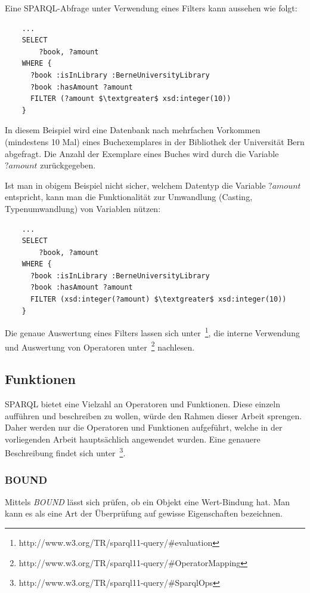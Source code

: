 Eine SPARQL-Abfrage unter Verwendung eines Filters kann aussehen wie folgt:
\begin{lstlisting}
    ...
    SELECT
        ?book, ?amount
    WHERE {
      ?book :isInLibrary :BerneUniversityLibrary
      ?book :hasAmount ?amount
      FILTER (?amount $\textgreater$ xsd:integer(10))
    }
\end{lstlisting}
In diesem Beispiel wird eine Datenbank nach mehrfachen Vorkommen (mindestens 10 Mal) eines Buchexemplares in der Bibliothek der Universität Bern abgefragt. Die Anzahl der Exemplare eines Buches wird durch die Variable $?amount$ zurückgegeben.

Ist man in obigem Beispiel nicht sicher, welchem Datentyp die Variable $?amount$ entspricht, kann man die Funktionalität zur Umwandlung (Casting, Typenumwandlung) von Variablen nützen:
\begin{lstlisting}
    ...
    SELECT
        ?book, ?amount
    WHERE {
      ?book :isInLibrary :BerneUniversityLibrary
      ?book :hasAmount ?amount
      FILTER (xsd:integer(?amount) $\textgreater$ xsd:integer(10))
    }
\end{lstlisting}

Die genaue Auswertung eines Filters lassen sich unter~\footnote{http://www.w3.org/TR/sparql11-query/\#evaluation}, die interne Verwendung und Auswertung von Operatoren unter~\footnote{http://www.w3.org/TR/sparql11-query/\#OperatorMapping} nachlesen.

\subsection{Funktionen}
\label{subsec:sparql_ausdruecke_funktionen}

SPARQL bietet eine Vielzahl an Operatoren und Funktionen. Diese einzeln aufführen und beschreiben zu wollen, würde den Rahmen dieser Arbeit sprengen. Daher werden nur die Operatoren und Funktionen aufgeführt, welche in der vorliegenden Arbeit hauptsächlich angewendet wurden. Eine genauere Beschreibung findet sich unter~\footnote{http://www.w3.org/TR/sparql11-query/\#SparqlOps}.

\subsubsection{BOUND}
\label{subsec:sparql_ausdruecke_funktionen_bound}
Mittels \textit{BOUND} lässt sich prüfen, ob ein Objekt eine Wert-Bindung hat. Man kann es als eine Art der Überprüfung auf gewisse Eigenschaften bezeichnen.

